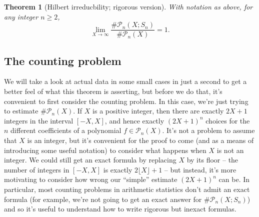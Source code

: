 \documentclass[12pt]{amsart}
\newtheorem{theorem}{Theorem}
\theoremstyle{definition} \newtheorem*{notation}{Notation}
\theoremstyle{remark} \newtheorem*{remark}{Remark}
\numberwithin{equation}{section}
\numberwithin{theorem}{section}
\begin{document}
	\begin{theorem}[Hilbert irreducbility; rigorous version] \label{thm:hilbert-irreducibility}
		With notation as above, for any integer $n \geq 2$,
			\[
				\lim_{X \to \infty} \frac{\#\mathcal{P}_n(X;S_n)}{\#\mathcal{P}_n(X)} = 1.
			\]
	\end{theorem}
	
	\subsection{The counting problem}
	
	We will take a look at actual data in some small cases in just a second to get a better feel of what this theorem is asserting, but before we do that, it's convenient to first consider the counting problem.  In this case, we're just trying to estimate $\#\mathcal{P}_n(X)$.  If $X$ is a positive integer, then there are exactly $2X+1$ integers in the interval $[-X,X]$, and hence exactly $(2X+1)^n$ choices for the $n$ different coefficients of a polynomial $f \in \mathcal{P}_n(X)$.  It's not a problem to assume that $X$ is an integer, but it's convenient for the proof to come (and as a means of introducing some useful notation) to consider what happens when $X$ is not an integer.  We could still get an exact formula by replacing $X$ by its floor -- the number of integers in $[-X,X]$ is exactly $2\lfloor X\rfloor + 1$ -- but instead, it's more motivating to consider how wrong our ``simple'' estimate $(2X+1)^n$ can be.  In particular, most counting problems in arithmetic statistics don't admit an exact formula (for example, we're not going to get an exact answer for $\#\mathcal{P}_n(X;S_n)$) and so it's useful to understand how to write rigorous but inexact formulas.
	
\end{document}
